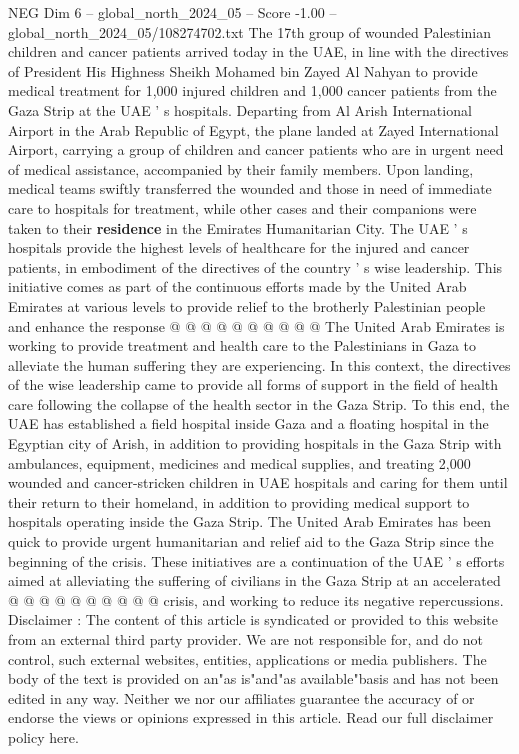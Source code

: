\begin{textsample}{NEG Dim 6 – global\_north\_2024\_05 – Score -1.00 – global\_north\_2024\_05/108274702.txt}  \label{ex:f6_neg_292}
The 17th group of wounded Palestinian children and cancer patients arrived today in the UAE, in line with the directives of President His Highness Sheikh Mohamed bin Zayed Al Nahyan to provide medical treatment for 1,000 injured children and 1,000 cancer patients from the Gaza Strip at the UAE ' s hospitals.
Departing from Al Arish International Airport in the Arab Republic of Egypt, the plane landed at Zayed International Airport, carrying a group of children and cancer patients who are in urgent need of medical assistance, accompanied by their family members.
Upon landing, medical teams swiftly transferred the wounded and those in need of immediate care to hospitals for treatment, while other cases and their companions were taken to their \textbf{residence} in the Emirates Humanitarian City.
The UAE ' s hospitals provide the highest levels of healthcare for the injured and cancer patients, in embodiment of the directives of the country ' s wise leadership.
This initiative comes as part of the continuous efforts made by the United Arab Emirates at various levels to provide relief to the brotherly Palestinian people and enhance the response @ @ @ @ @ @ @ @ @ @ The United Arab Emirates is working to provide treatment and health care to the Palestinians in Gaza to alleviate the human suffering they are experiencing.
In this context, the directives of the wise leadership came to provide all forms of support in the field of health care following the collapse of the health sector in the Gaza Strip.
To this end, the UAE has established a field hospital inside Gaza and a floating hospital in the Egyptian city of Arish, in addition to providing hospitals in the Gaza Strip with ambulances, equipment, medicines and medical supplies, and treating 2,000 wounded and cancer-stricken children in UAE hospitals and caring for them until their return to their homeland, in addition to providing medical support to hospitals operating inside the Gaza Strip.
The United Arab Emirates has been quick to provide urgent humanitarian and relief aid to the Gaza Strip since the beginning of the crisis.
These initiatives are a continuation of the UAE ' s efforts aimed at alleviating the suffering of civilians in the Gaza Strip at an accelerated @ @ @ @ @ @ @ @ @ @ crisis, and working to reduce its negative repercussions.
Disclaimer : The content of this article is syndicated or provided to this website from an external third party provider.
We are not responsible for, and do not control, such external websites, entities, applications or media publishers.
The body of the text is provided on an"as is"and"as available"basis and has not been edited in any way.
Neither we nor our affiliates guarantee the accuracy of or endorse the views or opinions expressed in this article.
Read our full disclaimer policy here.

\end{textsample}

